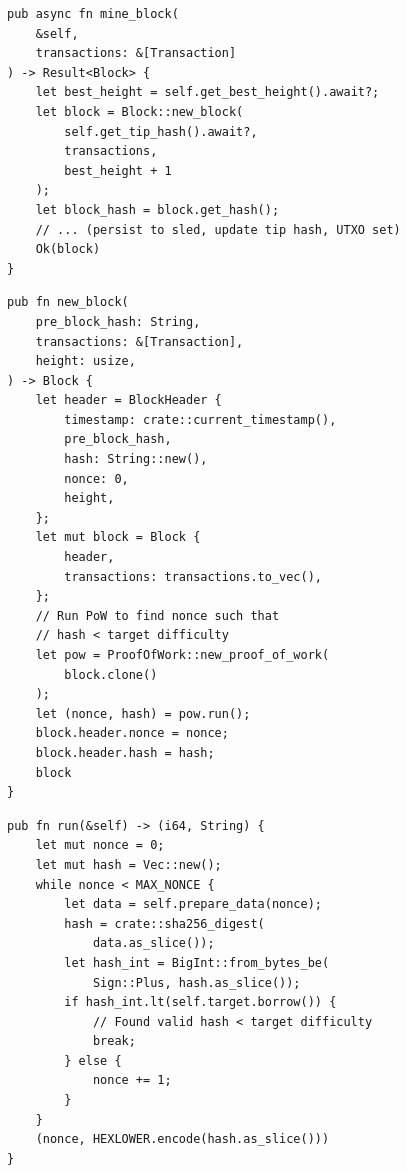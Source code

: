 \begin{listing}[htbp]
\caption{Block mining (construct + update state) ()}
\label{lst:9-7-3}
\begin{verbatim}
pub async fn mine_block(
    &self,
    transactions: &[Transaction]
) -> Result<Block> {
    let best_height = self.get_best_height().await?;
    let block = Block::new_block(
        self.get_tip_hash().await?,
        transactions,
        best_height + 1
    );
    let block_hash = block.get_hash();
    // ... (persist to sled, update tip hash, UTXO set)
    Ok(block)
}
\end{verbatim}
\end{listing}

\begin{listing}[htbp]
\caption{Block construction + proof-of-work ()}
\label{lst:9-7-4}
\begin{verbatim}
pub fn new_block(
    pre_block_hash: String,
    transactions: &[Transaction],
    height: usize,
) -> Block {
    let header = BlockHeader {
        timestamp: crate::current_timestamp(),
        pre_block_hash,
        hash: String::new(),
        nonce: 0,
        height,
    };
    let mut block = Block {
        header,
        transactions: transactions.to_vec(),
    };
    // Run PoW to find nonce such that
    // hash < target difficulty
    let pow = ProofOfWork::new_proof_of_work(
        block.clone()
    );
    let (nonce, hash) = pow.run();
    block.header.nonce = nonce;
    block.header.hash = hash;
    block
}
\end{verbatim}
\end{listing}

\begin{listing}[htbp]
\caption{Proof-of-work loop ()}
\label{lst:9-7-5}
\begin{verbatim}
pub fn run(&self) -> (i64, String) {
    let mut nonce = 0;
    let mut hash = Vec::new();
    while nonce < MAX_NONCE {
        let data = self.prepare_data(nonce);
        hash = crate::sha256_digest(
            data.as_slice());
        let hash_int = BigInt::from_bytes_be(
            Sign::Plus, hash.as_slice());
        if hash_int.lt(self.target.borrow()) {
            // Found valid hash < target difficulty
            break;
        } else {
            nonce += 1;
        }
    }
    (nonce, HEXLOWER.encode(hash.as_slice()))
}
\end{verbatim}
\end{listing}

